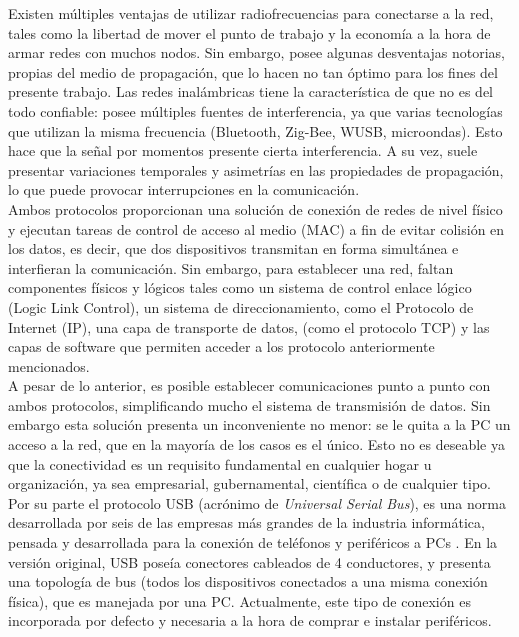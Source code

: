 Existen múltiples ventajas de utilizar radiofrecuencias para conectarse a la red, tales como la libertad de mover el punto de trabajo y la economía a la hora de armar redes con muchos nodos. Sin embargo, posee algunas desventajas notorias, propias del medio de propagación, que lo hacen no tan óptimo para los fines del presente trabajo. Las redes inalámbricas tiene la característica de que no es del todo confiable: posee múltiples fuentes de interferencia, ya que varias tecnologías que utilizan la misma frecuencia (Bluetooth, Zig-Bee, WUSB, microondas). Esto hace que la señal por momentos presente cierta interferencia. A su vez, suele presentar variaciones temporales y asimetrías en las propiedades de propagación, lo que puede provocar interrupciones en la comunicación.\\

Ambos protocolos proporcionan una solución de conexión de redes de nivel físico y ejecutan tareas de control de acceso al medio (MAC) a fin de evitar colisión en los datos, es decir, que dos dispositivos transmitan en forma simultánea e interfieran la comunicación.
Sin embargo, para establecer una red, faltan componentes físicos y lógicos tales como un sistema de control enlace lógico (Logic Link Control), un sistema de direccionamiento, como el Protocolo de Internet (IP), una capa de transporte de datos, (como el protocolo TCP) y las capas de software que permiten acceder a los protocolo anteriormente mencionados.\\

A pesar de lo anterior, es posible establecer comunicaciones punto a punto con ambos protocolos, simplificando mucho el sistema de transmisión de datos. Sin embargo esta solución presenta un inconveniente no menor: se le quita a la PC un acceso a la red, que en la mayoría de los casos es el único. Esto no es deseable ya que la conectividad es un requisito fundamental en cualquier hogar u organización, ya sea empresarial, gubernamental, científica o de cualquier tipo.\\

Por su parte el protocolo USB (acrónimo de {\it Universal Serial Bus}), es una norma desarrollada por seis de las empresas más grandes de la industria informática, pensada y desarrollada para la conexión de teléfonos y periféricos a PCs \cite{USBspec}. En la versión original, USB poseía conectores cableados de 4 conductores, y presenta una topología de bus (todos los dispositivos conectados a una misma conexión física), que es manejada por una PC. Actualmente, este tipo de conexión es incorporada por defecto y necesaria a la hora de comprar e instalar periféricos.\\


